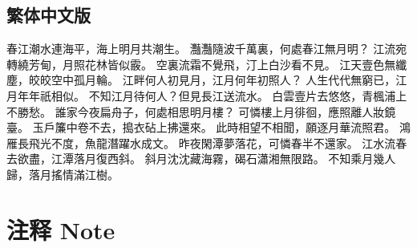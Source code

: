 \documentclass[a4paper]{article}
\begin{document}
    \subsection{繁体中文版}
        \begin{center}
            春江潮水連海平，海上明月共潮生。\newline
            灩灩隨波千萬裏，何處春江無月明？\newline
            江流宛轉繞芳甸，月照花林皆似霰。\newline
            空裏流霜不覺飛，汀上白沙看不見。\newline
            江天壹色無纖塵，皎皎空中孤月輪。\newline
            江畔何人初見月，江月何年初照人？\newline
            人生代代無窮已，江月年年祇相似。\newline
            不知江月待何人？但見長江送流水。\newline
            白雲壹片去悠悠，青楓浦上不勝愁。\newline
            誰家今夜扁舟子，何處相思明月樓？\newline
            可憐樓上月徘徊，應照離人妝鏡臺。\newline
            玉戶簾中卷不去，搗衣砧上拂還來。\newline
            此時相望不相聞，願逐月華流照君。\newline
            鴻雁長飛光不度，魚龍潛躍水成文。\newline
            昨夜閑潭夢落花，可憐春半不還家。\newline
            江水流春去欲盡，江潭落月復西斜。\newline
            斜月沈沈藏海霧，碣石瀟湘無限路。\newline
            不知乘月幾人歸，落月搖情滿江樹。\newline
        \end{center}
\newpage
\section{注释 Note}
\end{document}
